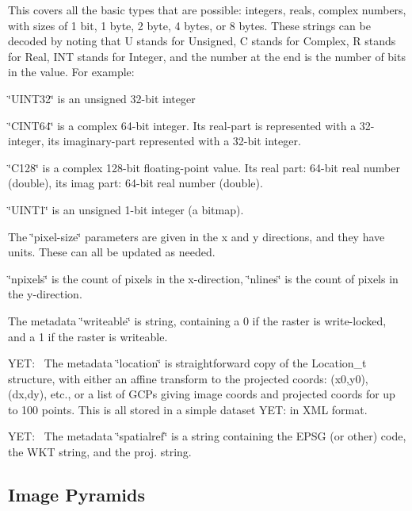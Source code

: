 This covers all the basic types that are possible\+: integers, reals, complex numbers, with sizes of 1 bit, 1 byte, 2 byte, 4 bytes, or 8 bytes. These strings can be decoded by noting that U stands for Unsigned, C stands for Complex, R stands for Real, I\+N\+T stands for Integer, and the number at the end is the number of bits in the value. For example\+:

\begin{DoxyItemize}
\item {\ttfamily \char`\"{}\+U\+I\+N\+T32\char`\"{}} is an unsigned 32-\/bit integer \item {\ttfamily \char`\"{}\+C\+I\+N\+T64\char`\"{}} is a complex 64-\/bit integer. It\textquotesingle{}s real-\/part is represented with a 32-\/integer, it\textquotesingle{}s imaginary-\/part represented with a 32-\/bit integer. \item {\ttfamily \char`\"{}\+C128\char`\"{}} is a complex 128-\/bit floating-\/point value. It\textquotesingle{}s real part\+: 64-\/bit real number (double), it\textquotesingle{}s imag part\+: 64-\/bit real number (double). \item {\ttfamily \char`\"{}\+U\+I\+N\+T1\char`\"{}} is an unsigned 1-\/bit integer (a bitmap).\end{DoxyItemize}
The \char`\"{}pixel-\/size\char`\"{} parameters are given in the {\ttfamily x} and {\ttfamily y} directions, and they have units. These can all be updated as needed.

\char`\"{}npixels\char`\"{} is the count of pixels in the x-\/direction, \char`\"{}nlines\char`\"{} is the count of pixels in the y-\/direction.

The metadata \char`\"{}writeable\char`\"{} is string, containing a 0 if the raster is write-\/locked, and a 1 if the raster is writeable.

Y\+E\+T\+:~\newline
The metadata \char`\"{}location\char`\"{} is straightforward copy of the {\ttfamily Location\+\_\+t} structure, with either an affine transform to the projected coords\+: (x0,y0), (dx,dy), etc., or a list of G\+C\+Ps giving image coords and projected coords for up to 100 points. This is all stored in a simple dataset Y\+E\+T\+: in X\+M\+L format.

Y\+E\+T\+:~\newline
The metadata \char`\"{}spatialref\char`\"{} is a string containing the E\+P\+S\+G (or other) code, the W\+K\+T string, and the proj. string.\hypertarget{file_format_file_format_iamge_pyramids}{}\subsection{Image Pyramids}\label{file_format_file_format_iamge_pyramids}

